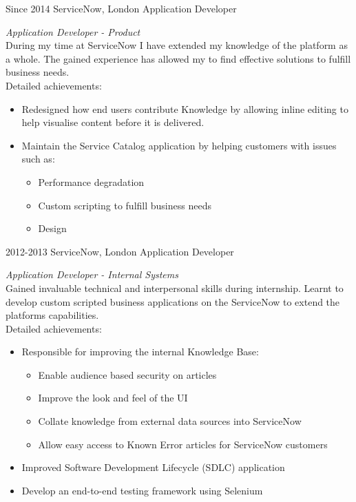 \documentclass[]{friggeri-cv}
\begin{document}
\begin{entrylist}
  \entry
    {Since 2014}
    {ServiceNow, London}
    {Application Developer}
    {\emph{Application Developer - Product} \\
    During my time at ServiceNow I have extended my knowledge of the platform as a whole. The gained experience has allowed my to find effective solutions to fulfill business needs. \\
    Detailed achievements: 
    \begin{itemize}
    
        \item {Redesigned how end users contribute Knowledge by allowing inline editing to help visualise content before it is delivered.}
        \item {Maintain the Service Catalog application by helping customers with issues such as:}
        \begin{itemize}
            \item {Performance degradation}
            \item {Custom scripting to fulfill business needs}
            \item {Design}
        \end{itemize}
    \end{itemize}
    }
  \entry
    {2012-2013}
    {ServiceNow, London}
    {Application Developer}
    {\emph{Application Developer - Internal Systems} \\
    Gained invaluable technical and interpersonal skills during internship. Learnt to develop custom scripted business applications on the ServiceNow to extend the platforms capabilities. \\
    Detailed achievements:
    \begin{itemize}
        \item {Responsible for improving the internal Knowledge Base:}
             \begin{itemize}
                \item {Enable audience based security on articles}
                \item {Improve the look and feel of the UI}
                \item {Collate knowledge from external data sources into ServiceNow}
                \item {Allow easy access to Known Error articles for ServiceNow customers}
            \end{itemize}
        \item {Improved Software Development Lifecycle (SDLC) application}
        \item {Develop an end-to-end testing framework using Selenium}
    \end{itemize}
    }
\end{entrylist}
\end{document}
